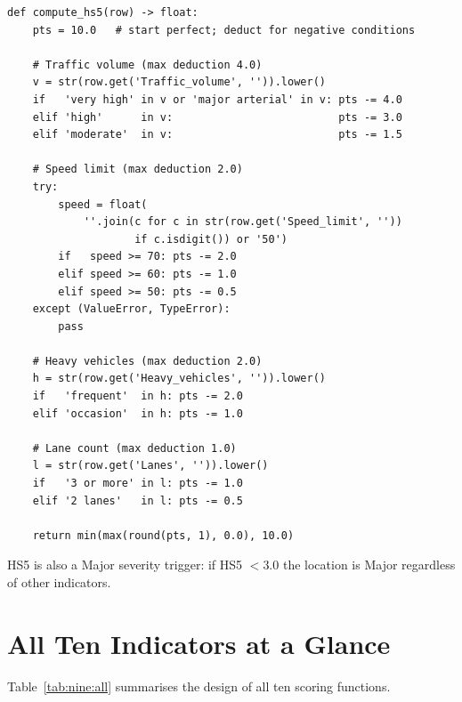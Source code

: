\documentclass[11pt,a4paper,openany]{book}
\begin{document}
\begin{lstlisting}[style=python, caption={src/scoring/hs5.py --- deductive scoring pattern.}]
def compute_hs5(row) -> float:
    pts = 10.0   # start perfect; deduct for negative conditions

    # Traffic volume (max deduction 4.0)
    v = str(row.get('Traffic_volume', '')).lower()
    if   'very high' in v or 'major arterial' in v: pts -= 4.0
    elif 'high'      in v:                          pts -= 3.0
    elif 'moderate'  in v:                          pts -= 1.5

    # Speed limit (max deduction 2.0)
    try:
        speed = float(
            ''.join(c for c in str(row.get('Speed_limit', ''))
                    if c.isdigit()) or '50')
        if   speed >= 70: pts -= 2.0
        elif speed >= 60: pts -= 1.0
        elif speed >= 50: pts -= 0.5
    except (ValueError, TypeError):
        pass

    # Heavy vehicles (max deduction 2.0)
    h = str(row.get('Heavy_vehicles', '')).lower()
    if   'frequent'  in h: pts -= 2.0
    elif 'occasion'  in h: pts -= 1.0

    # Lane count (max deduction 1.0)
    l = str(row.get('Lanes', '')).lower()
    if   '3 or more' in l: pts -= 1.0
    elif '2 lanes'   in l: pts -= 0.5

    return min(max(round(pts, 1), 0.0), 10.0)
\end{lstlisting}

HS5 is also a Major severity trigger: if HS5 $< 3.0$ the location is Major regardless of other indicators.

\section{All Ten Indicators at a Glance}

Table~\ref{tab:nine:all} summarises the design of all ten scoring functions.
\end{document}
